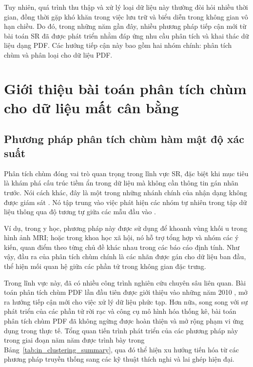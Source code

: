 \documentclass[a4paper,oneside]{book} %
\theoremstyle{plain}
\theoremstyle{plain}
\theoremstyle{nonumberplain}
\begin{document}
Tuy nhiên, quá trình thu thập và xử lý loại dữ liệu này thường đòi hỏi nhiều thời gian, đồng thời gặp khó khăn trong việc lưu trữ và biểu diễn trong không gian vô hạn chiều. Do đó, trong những năm gần đây, nhiều phương pháp tiếp cận mới từ bài toán SR đã được phát triển nhằm đáp ứng nhu cầu phân tích và khai thác dữ liệu dạng PDF. Các hướng tiếp cận này bao gồm hai nhóm chính: phân tích chùm và phân loại cho dữ liệu PDF.


\section{Giới thiệu bài toán phân tích chùm cho dữ liệu mất cân bằng}


\subsection{Phương pháp phân tích chùm hàm mật độ xác suất}


Phân tích chùm đóng vai trò quan trọng trong lĩnh vực SR, đặc biệt khi mục tiêu là khám phá cấu trúc tiềm ẩn trong dữ liệu mà không cần thông tin gán nhãn trước. Nói cách khác, đây là một trong những nhánh chính của nhận dạng không được giám sát  \cite{jain2010data,saxena2017review,dinh2025categorical}. Nó tập trung vào việc phát hiện các nhóm tự nhiên trong tập dữ liệu thông qua độ tương tự giữa các mẫu đầu vào \cite{Bishop:DeepLearning24,webb2003statistical}.

Ví dụ, trong y học, phương pháp này được sử dụng để khoanh vùng khối u trong hình ảnh MRI; hoặc trong khoa học xã hội, nó hỗ trợ tổng hợp và nhóm các ý kiến, quan điểm theo từng chủ đề khác nhau trong các báo cáo định tính. Như vậy, đầu ra của phân tích chùm chính là các nhãn được gán cho dữ liệu ban đầu, thể hiện mối quan hệ giữa các phần tử trong không gian đặc trưng.

Trong lĩnh vực này, đã có nhiều công trình nghiên cứu chuyên sâu liên quan. Bài toán phân tích chùm PDF lần đầu tiên được giới thiệu vào những năm 2010 \cite{vovan2019cluster,vovan2025classifying}, mở ra hướng tiếp cận mới cho việc xử lý dữ liệu phức tạp. Hơn nữa, song song với sự phát triển của các phần tử rời rạc và công cụ mô hình hóa thống kê, bài toán phân tích chùm PDF đã không ngừng được hoàn thiện và mở rộng phạm vi ứng dụng trong thực tế. Tổng quan tiến trình phát triển của các phương pháp này trong giai đoạn năm năm được trình bày trong Bảng~\ref{tab:in_clustering_summary}, qua đó thể hiện xu hướng tiến hóa từ các phương pháp truyền thống sang các kỹ thuật thích nghi và lai ghép hiện đại.
\end{document}
